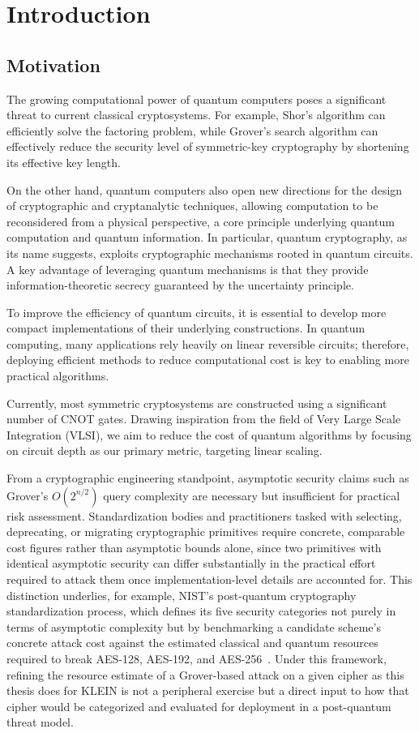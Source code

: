 \chapter{Introduction}
\label{ch:introduction}

\section{Motivation}
The growing computational power of quantum computers poses a significant threat to current classical cryptosystems. For example, Shor's algorithm can efficiently solve the factoring problem, while Grover's search algorithm can effectively reduce the security level of symmetric-key cryptography by shortening its effective key length.

On the other hand, quantum computers also open new directions for the design of cryptographic and cryptanalytic techniques, allowing computation to be reconsidered from a physical perspective, a core principle underlying quantum computation and quantum information. In particular, quantum cryptography, as its name suggests, exploits cryptographic mechanisms rooted in quantum circuits. A key advantage of leveraging quantum mechanisms is that they provide information-theoretic secrecy guaranteed by the uncertainty principle.

To improve the efficiency of quantum circuits, it is essential to develop more compact implementations of their underlying constructions. In quantum computing, many applications rely heavily on linear reversible circuits; therefore, deploying efficient methods to reduce computational cost is key to enabling more practical algorithms.

Currently, most symmetric cryptosystems are constructed using a significant number of CNOT gates. Drawing inspiration from the field of Very Large Scale Integration (VLSI), we aim to reduce the cost of quantum algorithms by focusing on circuit depth as our primary metric, targeting linear scaling.

From a cryptographic engineering standpoint, asymptotic security claims such as
Grover's $O(2^{n/2})$ query complexity are necessary but insufficient for
practical risk assessment. Standardization bodies and practitioners tasked with
selecting, deprecating, or migrating cryptographic primitives require concrete,
comparable cost figures rather than asymptotic bounds alone, since two
primitives with identical asymptotic security can differ substantially in the
practical effort required to attack them once implementation-level
details are accounted for. This distinction underlies, for example, NIST's
post-quantum cryptography standardization process, which defines its five
security categories not purely in terms of asymptotic complexity but by
benchmarking a candidate scheme's concrete attack cost against the estimated
classical and quantum resources required to break AES-128, AES-192, and
AES-256~\cite{chen2016report}. Under this framework, refining the resource
estimate of a Grover-based attack on a given cipher as this thesis does for
KLEIN is not a peripheral exercise but a direct input to how that cipher
would be categorized and evaluated for deployment in a post-quantum threat
model.

